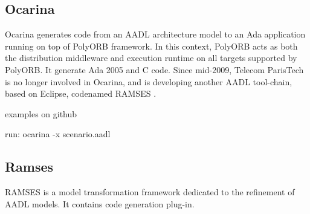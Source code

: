 \subsection{Ocarina}
\label{background:codegen:ocarina}
Ocarina \cite{Ocarina:Paper,Ocarina:Paper} generates code from an AADL architecture model to an Ada application running on top of PolyORB framework. In this context, PolyORB acts as both the distribution middleware and execution runtime on all targets supported by PolyORB.
It generate Ada 2005 and C code.
Since mid-2009, Telecom ParisTech is no longer involved in Ocarina, and is developing another AADL tool-chain, based on Eclipse, codenamed RAMSES \cite{Ocarina:About:Online}.

examples on github

run:
ocarina -x scenario.aadl



\subsection{Ramses}
\label{background:codegen:ramses}
RAMSES is a model transformation framework dedicated to the refinement of AADL models. It contains code generation plug-in.
